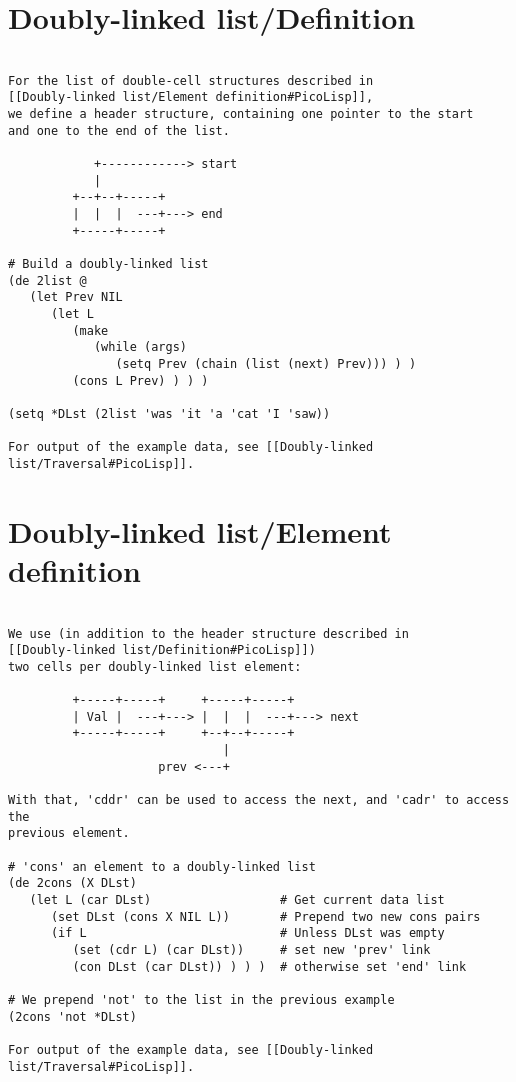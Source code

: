 \section*{Doubly-linked list/Definition}

\begin{verbatim}

For the list of double-cell structures described in
[[Doubly-linked list/Element definition#PicoLisp]],
we define a header structure, containing one pointer to the start
and one to the end of the list.

            +------------> start
            |
         +--+--+-----+
         |  |  |  ---+---> end
         +-----+-----+

# Build a doubly-linked list
(de 2list @
   (let Prev NIL
      (let L
         (make
            (while (args)
               (setq Prev (chain (list (next) Prev))) ) )
         (cons L Prev) ) ) )

(setq *DLst (2list 'was 'it 'a 'cat 'I 'saw))

For output of the example data, see [[Doubly-linked list/Traversal#PicoLisp]].

\end{verbatim}

\section*{Doubly-linked list/Element definition}

\begin{verbatim}

We use (in addition to the header structure described in
[[Doubly-linked list/Definition#PicoLisp]])
two cells per doubly-linked list element:

         +-----+-----+     +-----+-----+
         | Val |  ---+---> |  |  |  ---+---> next
         +-----+-----+     +--+--+-----+
                              |
                     prev <---+

With that, 'cddr' can be used to access the next, and 'cadr' to access the
previous element.

# 'cons' an element to a doubly-linked list
(de 2cons (X DLst)
   (let L (car DLst)                  # Get current data list
      (set DLst (cons X NIL L))       # Prepend two new cons pairs
      (if L                           # Unless DLst was empty
         (set (cdr L) (car DLst))     # set new 'prev' link
         (con DLst (car DLst)) ) ) )  # otherwise set 'end' link

# We prepend 'not' to the list in the previous example
(2cons 'not *DLst)

For output of the example data, see [[Doubly-linked list/Traversal#PicoLisp]].

\end{verbatim}

